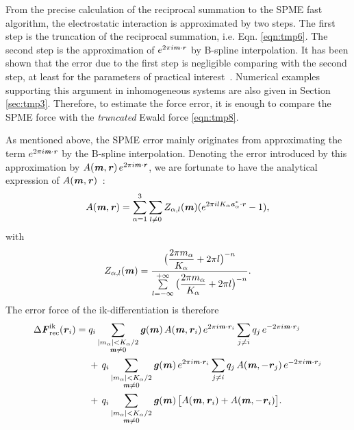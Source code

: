 \documentclass[aps,pre,preprint]{revtex4}
\renewcommand{\v}[1]{\textbf{\textit{#1}}}
\begin{document}
From the precise calculation of the reciprocal summation to the SPME
fast algorithm, the electrostatic interaction is approximated by two
steps.  The first step is the truncation of the reciprocal summation,
i.e. Eqn. \eqref{eqn:tmp6}. The second step is the approximation of
$e^{2\pi i\v m\cdot\v r}$ by B-spline
interpolation. It has been shown that the
error due to the first step is negligible comparing with the second
step,
at least for the parameters of practical interest~\cite{wang2010optimizing}.
Numerical
examples supporting this argument in inhomogeneous systems are also
given in Section \ref{sec:tmp3}.  Therefore, to estimate the force
error, it is enough to compare the SPME force with the
\emph{truncated} Ewald force \eqref{eqn:tmp8}. 

As mentioned above, the SPME error mainly originates from approximating
the term $e^{2\pi i\v m\cdot\v r}$ by the B-spline
interpolation. Denoting the error introduced by this approximation by
$A(\v m, \v r)\,e^{2\pi i\v m\cdot \v r}$, we are fortunate to have
the analytical expression of $A(\v m, \v r)$~\cite{schoenberg1987cardinal}:
\begin{align}\label{eqn:error-A}
  A(\v m, \v r)
  =
  \sum_{\alpha=1}^3\sum_{l\neq 0}
  Z_{\alpha,l}(\v m)
  (
  e^{2\pi i l K_\alpha\v a^\ast_\alpha\cdot \v r} - 1
  ),
\end{align}
with
\begin{align}
  Z_{\alpha,l}(\v m) = \frac
  {\big(\dfrac{2\pi m_\alpha}{K_\alpha} + 2\pi l\big)^{-n}}
  {\sum\limits_{l=-\infty}^{+\infty}
    \big(\dfrac{2\pi m_\alpha}{K_\alpha} + 2\pi l\big)^{-n}}.
\end{align}
The error force of the ik-differentiation is therefore
\begin{align}\nonumber
  \Delta\v F_{\textrm{rec}}^{\textrm{ik}}(\v r_i)
  =\;&
  q_i
  \sum_{
    \begin{subarray}{c}
      \vert m_{\alpha}\vert < K_\alpha/2\\
      \v m\neq 0
    \end{subarray}}
  \v g(\v m)\,
  A(\v m, \v r_i)\,
  e^{2\pi i\v m\cdot \v r_i}
  \sum_{j\neq i}q_j\,e^{-2\pi i\v m\cdot\v r_j} \\\nonumber
  & +\,
  q_i
  \sum_{
    \begin{subarray}{c}
      \vert m_{\alpha}\vert < K_\alpha/2\\
      \v m\neq 0
    \end{subarray}}
  \v g(\v m)\,
  e^{2\pi i\v m\cdot \v r_i}
  \sum_{j\neq i}q_j\,A(\v m, -\v r_j)\,e^{-2\pi i\v m\cdot\v r_j}\\\label{eqn:ik.error.force.1}
  & +\,
  q_i
  \sum_{
    \begin{subarray}{c}
      \vert m_{\alpha}\vert < K_\alpha/2\\
      \v m\neq 0
    \end{subarray}}
  \v g(\v m)\,
  \big[
  A(\v m, \v r_i) +
  A(\v m, -\v r_i)
  \big].
\end{align}
\end{document}
